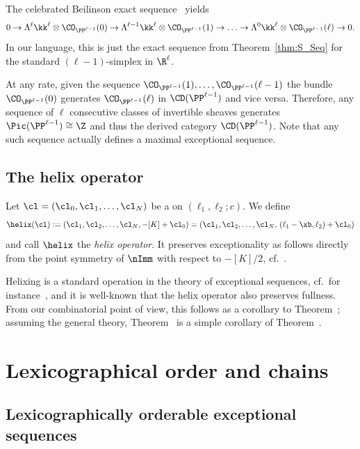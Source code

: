 \begin{exam}\label{ex:Beilinson}
The celebrated Beilinson exact 
sequence~\cite{beilinson} yields
\begin{equation}\label{eq:BeilSeq}
0 \to \Lambda^\ell\kk^{\ell}\otimes
\CO_{\PP^{\ell-1}}(0)\to
\Lambda^{\ell-1}\kk^{\ell}\otimes
\CO_{\PP^{\ell-1}}(1)\to\ldots\to
\Lambda^{0}\kk^{\ell}\otimes
\CO_{\PP^{\ell-1}}(\ell)\to 0.
\end{equation}
In our language, this is just the 
exact sequence from 
Theorem~\ref{thm:S_Seq} for the 
standard $(\ell-1)$-simplex 
in $\R^{\ell}$. 

At any rate, given the sequence 
$\CO_{\PP^{\ell-1}}(1),\ldots,
\CO_{\PP^{\ell-1}}(\ell-1)$ 
the bundle $\CO_{\PP^{\ell-1}}(0)$ 
generates $\CO_{\PP^{\ell-1}}(\ell)$ 
in $\CD(\PP^{\ell-1})$ and vice versa. 
Therefore, any sequence of $\ell$ consecutive 
classes of invertible sheaves generates 
$\Pic(\PP^{\ell-1})\cong\Z$ and thus 
the derived category $\CD(\PP^{\ell-1})$. 
Note that any such sequence actually 
defines a maximal exceptional 
sequence.
\end{exam}

\subsection{The helix operator}
\label{subsec:helixOp}
Let $\cl=(\cl_0,\cl_1,\ldots,\cl_N)$ be a 
{\mes} on $(\ell_1,\ell_2;c)$. We define
$$  
\helix(\cl):=(\cl_1,\cl_2,\ldots,\cl_N,
-[K]+\cl_0)=(\cl_1,\cl_2,\ldots,\cl_N,\,
(\ell_1-\xb,\ell_2)+\cl_0)
$$  
and call $\helix$ the {\em helix operator}. 
It preserves exceptionality as follows 
directly from the point symmetry of $\nImm$ 
with respect to $-[K]/2$, cf.\ 
. 

\begin{rema}
\label{rem:HelixOperator}
{Helixing is a standard operation in 
the theory of exceptional sequences, cf.\ for 
instance~\cite{rudakov}, and it is well-known 
that the helix operator also preserves fullness. 
From our combinatorial point of view, this follows 
as a corollary to Theorem~{\thFull}; assuming the 
general theory, Theorem~{\thFull} is a simple 
corollary of Theorem~{\thHelex}.}
\end{rema}

\section{Lexicographical order and chains}
\label{sec:Relax}
\subsection{Lexicographically orderable exceptional sequences}
\label{subsec:CriteriaRelax}


